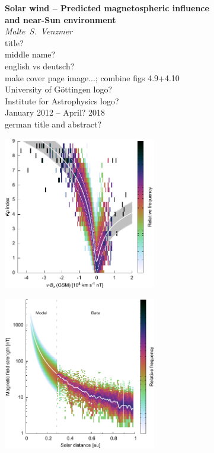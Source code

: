
\begin{titlepage}
	\begin{center}
		{\LARGE\sffamily
			\textbf{Solar wind -- Predicted magnetospheric influence\\and near-Sun environment}\\
		}
		\Large
		\textit{Malte~S.~Venzmer}\\
		title?\\
		middle name?\\
		english vs deutsch?\\
		make cover page image...; combine figs 4.9+4.10\\
		University of Göttingen logo?\\
		Institute for Astrophysics logo?\\
		January 2012 -- April? 2018\\
		german title and abstract?\\
	\end{center}
\end{titlepage}


\includegraphics[width=0.5\textwidth]{figures_of_mine/gnuplots/KpvsBz_titlepage.pdf}


	\includegraphics[width=0.5\textwidth]{figures_of_mine/gnuplots/fit_fixed_B_paper_f_title.pdf}
% 


